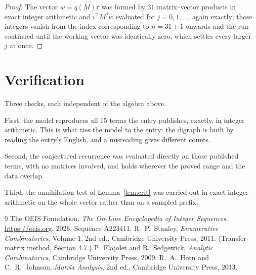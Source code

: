 \documentclass[11pt,a4paper]{article}
\theoremstyle{plain}
\theoremstyle{definition}
\begin{document}
\begin{proof}
The vector $w=q(M)\tau$ was formed by $31$ matrix--vector products in exact integer
arithmetic and $\iota^{\!\top}M^{j}w$ evaluated for $j=0,1,\dots$, again exactly; those
integers vanish from the index corresponding to $n=31+1$ onwards and the run continued
until the working vector was identically zero, which settles every larger $j$ at once.
\end{proof}

\section{Verification}

Three checks, each independent of the algebra above.

First, the model reproduces all $15$ terms the entry publishes, exactly, in integer
arithmetic. This is what ties the model to the entry: the digraph is built by reading the
entry's English, and a misreading gives different counts.

Second, the conjectured recurrence was evaluated directly on those published terms, with no
matrices involved, and holds wherever the proved range and the data overlap.

Third, the annihilation test of Lemma~\ref{lem:crit} was carried out in exact integer
arithmetic on the whole vector rather than on a sampled prefix.

\begin{thebibliography}{9}
 The OEIS Foundation, \emph{The On-Line Encyclopedia of Integer
Sequences}, \url{https://oeis.org}, 2026. Sequence A223411.
 R.~P.~Stanley, \emph{Enumerative Combinatorics}, Volume 1, 2nd ed.,
Cambridge University Press, 2011. (Transfer-matrix method, Section 4.7.)
 P.~Flajolet and R.~Sedgewick, \emph{Analytic Combinatorics}, Cambridge
University Press, 2009.
 R.~A.~Horn and C.~R.~Johnson, \emph{Matrix Analysis}, 2nd ed., Cambridge
University Press, 2013.
\end{thebibliography}
\end{document}
